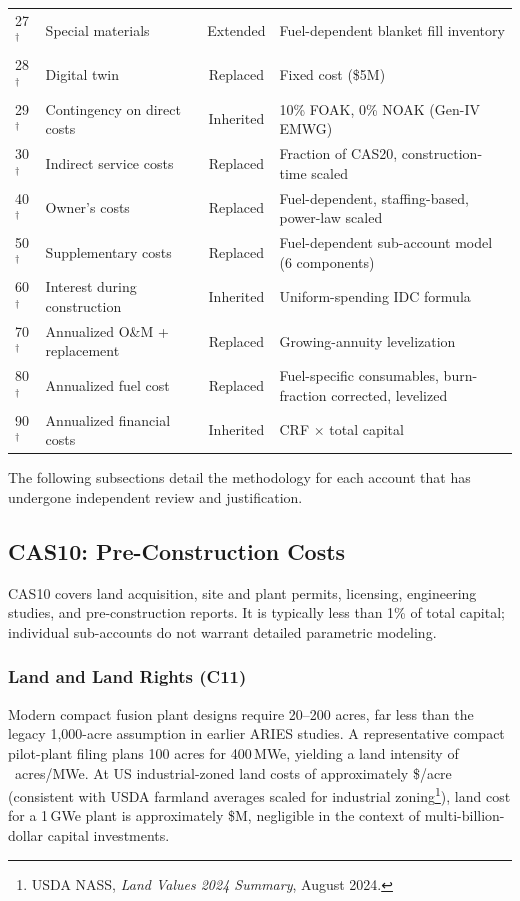 \documentclass{article}
\begin{document}
\begin{table}[htbp]
\begin{tabular}{llcp{6.0cm}}
27$^\dagger$ & Special materials & Extended & Fuel-dependent blanket fill inventory \\
28$^\dagger$ & Digital twin & Replaced & Fixed cost (\$5M) \\
29$^\dagger$ & Contingency on direct costs & Inherited & 10\% FOAK, 0\% NOAK (Gen-IV EMWG) \\
30$^\dagger$ & Indirect service costs & Replaced & Fraction of CAS20, construction-time scaled \\
40$^\dagger$ & Owner's costs & Replaced & Fuel-dependent, staffing-based, power-law scaled \\
50$^\dagger$ & Supplementary costs & Replaced & Fuel-dependent sub-account model (6 components) \\
60$^\dagger$ & Interest during construction & Inherited & Uniform-spending IDC formula \\
70$^\dagger$ & Annualized O\&M + replacement & Replaced & Growing-annuity levelization \\
80$^\dagger$ & Annualized fuel cost & Replaced & Fuel-specific consumables, burn-fraction corrected, levelized \\
90$^\dagger$ & Annualized financial costs & Inherited & CRF $\times$ total capital \\
\bottomrule
\end{tabular}
\end{table}

The following subsections detail the methodology for each account
that has undergone independent review and justification.


\subsection{CAS10: Pre-Construction Costs}
\label{sec:cas10}

CAS10 covers land acquisition, site and plant permits, licensing,
engineering studies, and pre-construction reports. It is typically less
than 1\% of total capital; individual sub-accounts do not warrant
detailed parametric modeling.

\subsubsection{Land and Land Rights (C11)}
Modern compact fusion plant designs require 20--200 acres, far less
than the legacy 1{,}000-acre assumption in earlier ARIES studies.
A representative compact pilot-plant filing \citep{cfs_arc} plans 100 acres for 400\,MWe,
yielding a land intensity of ~acres/MWe. At US
industrial-zoned land costs of approximately
\$/acre
(consistent with USDA farmland averages scaled for
industrial zoning\footnote{USDA NASS, \emph{Land Values 2024 Summary}, August 2024.}), land cost for a 1\,GWe plant is approximately
\$M, negligible in the context of multi-billion-dollar capital
investments.
\end{document}
